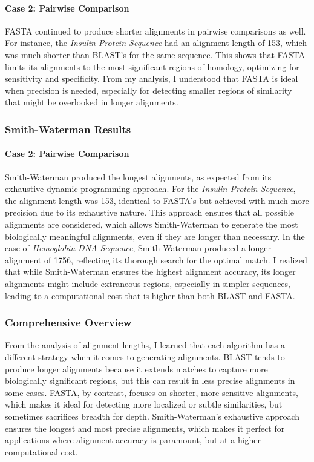 \documentclass{article}
\begin{document}
\paragraph{Case 2: Pairwise Comparison}
FASTA continued to produce shorter alignments in pairwise comparisons as well. For instance, the \textit{Insulin Protein Sequence} had an alignment length of 153, which was much shorter than BLAST’s for the same sequence. This shows that FASTA limits its alignments to the most significant regions of homology, optimizing for sensitivity and specificity. From my analysis, I understood that FASTA is ideal when precision is needed, especially for detecting smaller regions of similarity that might be overlooked in longer alignments.

\subsubsection{ Smith-Waterman Results}

\paragraph{Case 2: Pairwise Comparison}
Smith-Waterman produced the longest alignments, as expected from its exhaustive dynamic programming approach. For the \textit{Insulin Protein Sequence}, the alignment length was 153, identical to FASTA’s but achieved with much more precision due to its exhaustive nature. This approach ensures that all possible alignments are considered, which allows Smith-Waterman to generate the most biologically meaningful alignments, even if they are longer than necessary. In the case of \textit{Hemoglobin DNA Sequence}, Smith-Waterman produced a longer alignment of 1756, reflecting its thorough search for the optimal match. I realized that while Smith-Waterman ensures the highest alignment accuracy, its longer alignments might include extraneous regions, especially in simpler sequences, leading to a computational cost that is higher than both BLAST and FASTA.

\subsubsection{Comprehensive Overview}
From the analysis of alignment lengths, I learned that each algorithm has a different strategy when it comes to generating alignments. BLAST tends to produce longer alignments because it extends matches to capture more biologically significant regions, but this can result in less precise alignments in some cases. FASTA, by contrast, focuses on shorter, more sensitive alignments, which makes it ideal for detecting more localized or subtle similarities, but sometimes sacrifices breadth for depth. Smith-Waterman’s exhaustive approach ensures the longest and most precise alignments, which makes it perfect for applications where alignment accuracy is paramount, but at a higher computational cost. 
\end{document}
